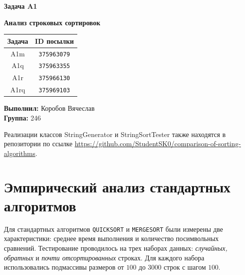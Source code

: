 \documentclass[a4paper,12pt]{extarticle}
\begin{document}
\begin{titlepage}
    \centering


    {\LARGE\bfseries Задача A1\par}
    \vspace{0.4cm}
    {\Large\bfseries Анализ строковых сортировок\par}


    \vspace{0.5cm}

    \begin{center}
    \begin{tabular}{|c|c|}
        \hline
        \textbf{Задача} & \textbf{ID посылки} \\
        \hline
        A1m & \texttt{375963079} \\
        \hline
        A1q & \texttt{375963355} \\
        \hline
        A1r & \texttt{375966130} \\
        \hline
        A1rq & \texttt{375969103} \\
        \hline
    \end{tabular}
    \end{center}

    \vspace{16cm}

    \begin{flushright}
        \large
        \textbf{Выполнил:} Коробов Вячеслав\\
        \textbf{Группа:} 246
    \end{flushright}



\end{titlepage}

Реализации классов StringGenerator и StringSortTester также находятся в репозитории по ссылке \href{https://github.com/StudentSK0/comparison-of-sorting-algorithms}{https://github.com/StudentSK0/comparison-of-sorting-algorithms}.

\section{Эмпирический анализ стандартных алгоритмов}

Для стандартных алгоритмов \texttt{QUICKSORT} и \texttt{MERGESORT} были измерены две характеристики: среднее время выполнения и количество посимвольных сравнений. Тестирование проводилось на трех наборах данных: \textit{случайных, обратных} и \textit{почти отсортированных} строках. Для каждого набора использовались подмассивы размеров от $100$ до $3000$ строк с шагом $100$.
\end{document}
